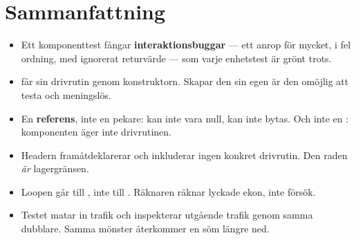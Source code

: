 \section*{Sammanfattning}

\begin{itemize}
  \item Ett komponenttest fångar \textbf{interaktionsbuggar} --- ett anrop för mycket, i fel
    ordning, med ignorerat returvärde --- som varje enhetstest är grönt trots.
  \item {} får sin drivrutin genom konstruktorn. Skapar den sin egen är den omöjlig
    att testa och  meningslös.
  \item En \textbf{referens}, inte en pekare: kan inte vara null, kan inte bytas. Och inte en
    : komponenten äger inte drivrutinen.
  \item Headern framåtdeklarerar  och inkluderar ingen konkret drivrutin. Den
    raden \emph{är} lagergränsen.
  \item Loopen går till , inte till . Räknaren räknar lyckade ekon,
    inte försök.
  \item Testet matar in trafik och inspekterar utgående trafik genom samma dubblare. Samma mönster
    återkommer en söm längre ned.
\end{itemize}
